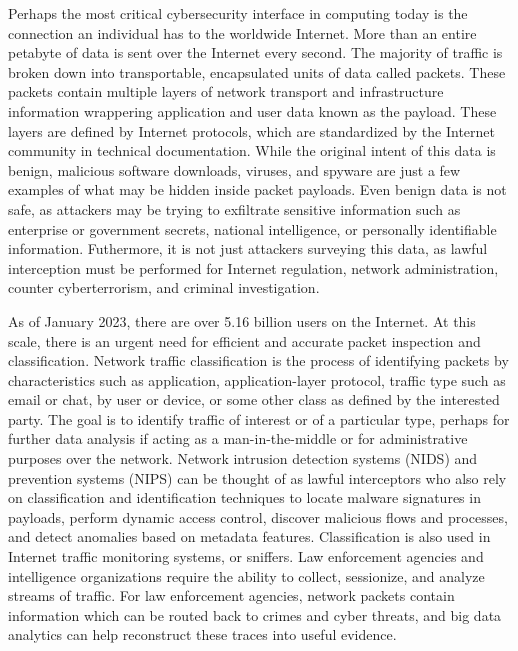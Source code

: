 Perhaps the most critical cybersecurity interface in computing today is the connection an individual has to the worldwide Internet. More than an entire petabyte of data is sent over the Internet every second. The majority of traffic is broken down into transportable, encapsulated units of data called packets. These packets contain multiple layers of network transport and infrastructure information wrappering application and user data known as the payload. These layers are defined by Internet protocols, which are standardized by the Internet community in technical documentation. While the original intent of this data is benign, malicious software downloads, viruses, and spyware are just a few examples of what may be hidden inside packet payloads. Even benign data is not safe, as attackers may be trying to exfiltrate sensitive information such as enterprise or government secrets, national intelligence, or personally identifiable information. Futhermore, it is not just attackers surveying this data, as lawful interception must be performed for Internet regulation, network administration, counter cyberterrorism, and criminal investigation.

As of January 2023, there are over 5.16 billion users on the Internet. At this scale, there is an urgent need for efficient and accurate packet inspection and classification. Network traffic classification is the process of identifying packets by characteristics such as application, application-layer protocol, traffic type such as email or chat, by user or device, or some other class as defined by the interested party. The goal is to identify traffic of interest or of a particular type, perhaps for further data analysis if acting as a man-in-the-middle or for administrative purposes over the network. Network intrusion detection systems (NIDS) and prevention systems (NIPS) can be thought of as lawful interceptors who also rely on classification and identification techniques to locate malware signatures in payloads, perform dynamic access control, discover malicious flows and processes, and detect anomalies based on metadata features. Classification is also used in Internet traffic monitoring systems, or sniffers. Law enforcement agencies and intelligence organizations require the ability to collect, sessionize, and analyze streams of traffic. For law enforcement agencies, network packets contain information which can be routed back to crimes and cyber threats, and big data analytics can help reconstruct these traces into useful evidence.

